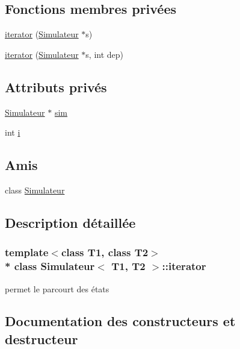 \subsection*{Fonctions membres privées}
\begin{DoxyCompactItemize}
\item 
\hyperlink{class_simulateur_1_1iterator_ab03c61222a97d94ec2d653e2d94912e9}{iterator} (\hyperlink{class_simulateur}{Simulateur} $\ast$s)
\item 
\hyperlink{class_simulateur_1_1iterator_acbbcdfedf00c642662752ca11032c81e}{iterator} (\hyperlink{class_simulateur}{Simulateur} $\ast$s, int dep)
\end{DoxyCompactItemize}
\subsection*{Attributs privés}
\begin{DoxyCompactItemize}
\item 
\hyperlink{class_simulateur}{Simulateur} $\ast$ \hyperlink{class_simulateur_1_1iterator_aefe7dba8b546a3b2baabe60dfbed43f8}{sim}
\item 
int \hyperlink{class_simulateur_1_1iterator_ac4a7c0f2c42b4b85f598b36674b1d772}{i}
\end{DoxyCompactItemize}
\subsection*{Amis}
\begin{DoxyCompactItemize}
\item 
class \hyperlink{class_simulateur_1_1iterator_ae6c3966e699bf920c86e0bd006bd8183}{Simulateur}
\end{DoxyCompactItemize}


\subsection{Description détaillée}
\subsubsection*{template$<$class T1, class T2$>$\\*
class Simulateur$<$ T1, T2 $>$\+::iterator}

permet le parcourt des états 

\subsection{Documentation des constructeurs et destructeur}
